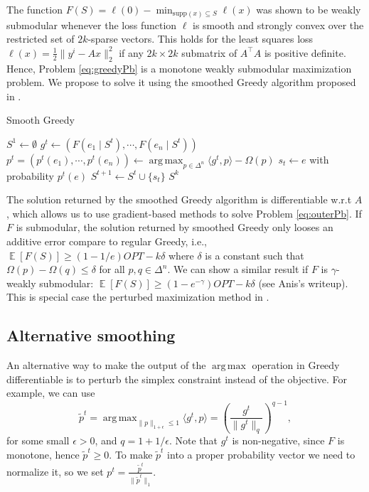 \documentclass[11pt]{article}
\newcommand{\EE}{\operatorname{\mathbb{E}}}
\newcommand{\supp}{\mathrm{supp}}
\DeclareMathOperator*{\argmax}{arg\,max}
\begin{document}
The function $F(S) = \ell(0) - \min_{\supp(x) \subseteq S} \ell(x)$ was shown to be weakly submodular  \cite{Elenberg2016} whenever the loss function $\ell$ is smooth and strongly convex over the restricted set of $2k$-sparse vectors. This holds for the least squares loss $\ell(x) = \frac{1}{2} \| y^i - A x\|_2^2$ if any $2k \times 2k$ submatrix of $A^\top A$ is positive definite.
Hence, Problem \ref{eq:greedyPb} is a monotone weakly submodular maximization problem. We propose to solve it using the smoothed Greedy algorithm proposed in \cite{sakaue2020differentiable}. 
\begin{algorithm}[H]
    \caption{Smooth Greedy \label{alg:smoothgreedy}}
    \begin{algorithmic}[1]
        \State $S^1 \leftarrow \emptyset$
            \State $g^t \leftarrow (F(e_1 \mid S^t), \cdots, F(e_{n}\mid S^t))$
            \State $p^t = (p^t(e_1), \cdots, p^t(e_{n})) \leftarrow \argmax_{p \in \Delta^{n}} \langle g^t, p \rangle - \Omega(p)$
            \State $s_t \leftarrow e$ with probability $p^t(e)$
            \State $S^{t+1} \leftarrow S^t \cup \{s_t\}$
        \EndFor
        \State \Return $S^k$
    \end{algorithmic}
\end{algorithm}

The solution returned by the smoothed Greedy algorithm is differentiable w.r.t $A$, which allows us to use gradient-based methods to solve Problem \ref{eq:outerPb}. If $F$ is submodular, the solution returned by smoothed Greedy only looses an additive error compare to regular Greedy, i.e., $\EE[F(S)] \geq (1-1/e) OPT - k \delta$ where $\delta$ is a constant such that $\Omega(p) - \Omega(q) \leq \delta$ for all $p, q \in \Delta^n$.
We can show a similar result if $F$ is $\gamma$-weakly submodular: $\EE[F(S)] \geq (1- e^{-\gamma}) OPT - k \delta$ (see Anis's writeup).
This is special case  the perturbed maximization method in \cite{Berthet2020}. 

\subsection{Alternative smoothing}

An alternative way to make the output of the $\argmax$ operation in Greedy differentiable is to perturb the simplex constraint instead of the objective. For example, we can use
\[ \tilde{p}^t = \argmax_{\| p \|_{1+\epsilon}  \leq 1} \langle g^t, p \rangle = (\frac{g^t}{\| g^t\|_q})^{q-1}, \]
for some small $\epsilon >0$, and $q = 1 + 1/\epsilon$. Note that $g^t$ is non-negative, since $F$ is monotone, hence $\tilde{p}^t \geq 0$. To make $\tilde{p}^t$ into a proper probability vector we need to normalize it, so we set $p^t = \frac{\tilde{p}^t}{\|\tilde{p}^t\|_1}$.\\
\end{document}

